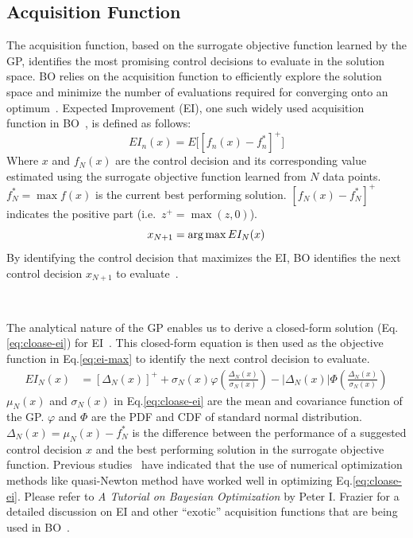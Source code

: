 \subsection{Acquisition Function}
The acquisition function, based on the surrogate objective function learned by the GP, identifies the most promising control decisions to evaluate in the solution space.
BO relies on the acquisition function to efficiently explore the solution space and minimize the number of evaluations required for converging onto an optimum~\cite{frazier2018tutorial}.
Expected Improvement (EI), one such widely used acquisition function in BO~\cite{jones1998efficient, frazier2018tutorial}, is defined as follows:
\begin{equation}\label{eq:EI}
		EI_n(x) = E \big[ {[ f_n(x) - f^*_n ]}^+ \big]
\end{equation}
Where $x$ and $f_N(x)$ are the control decision and its corresponding value estimated using the surrogate objective function learned from $N$ data points.
$f^*_N = \max f(x)$ is the current best performing solution. 
${[ f_N(x) - f^*_N ]}^+$ indicates the positive part (i.e.\ $z^+ = \max (z, 0)$).
\begin{equation}\label{eq:ei-max}
	x_{N+1} = \operatorname*{arg\,max} EI_N(x)
\end{equation}
By identifying the control decision that maximizes the EI, BO identifies the next control decision $x_{N+1}$ to evaluate~\cite{frazier2018tutorial}. 

\

The analytical nature of the GP enables us to derive a closed-form solution (Eq.\ref{eq:cloase-ei}) for EI~\cite{jones1998efficient}.
This closed-form equation is then used as the objective function in Eq.\ref{eq:ei-max} to identify the next control decision to evaluate.
\begin{align}\label{eq:cloase-ei}
	EI_N(x) &= {[\Delta_N(x)]}^+ + \sigma_N(x) \varphi(\frac{\Delta_N(x)}{\sigma_N(x)}) - |\Delta_N(x)| \Phi(\frac{\Delta_N(x)}{\sigma_N(x)})
\end{align}
$\mu_N(x)$ and $\sigma_N(x)$ in Eq.\ref{eq:cloase-ei} are the mean and covariance function of the GP\@.
$\varphi$ and $\Phi$ are the PDF and CDF of standard normal distribution.
$\Delta_N(x) = \mu_N(x) - f^*_N$ is the difference between the performance of a suggested control decision $x$ and the best performing solution in the surrogate objective function.
Previous studies~\cite{frazier2018tutorial} have indicated that the use of numerical optimization methods like quasi-Newton method have worked well in optimizing Eq.\ref{eq:cloase-ei}.
Please refer to \textit{A Tutorial on Bayesian Optimization} by Peter I. Frazier for a detailed discussion on EI and other ``exotic'' acquisition functions that are being used in BO~\cite{frazier2018tutorial}.

